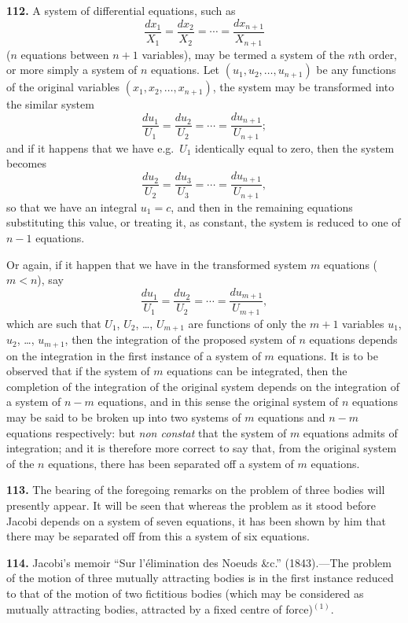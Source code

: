 \documentclass[11pt,a4paper]{article}
\theoremstyle{definition}
\begin{document}
\medskip

\textbf{112.} A system of differential equations, such as
\[
\frac{dx_1}{X_1} = \frac{dx_2}{X_2} = \cdots = \frac{dx_{n+1}}{X_{n+1}}
\]
($n$ equations between $n+1$ variables), may be termed a system of the $n$th order, or more simply a system of $n$ equations. Let $(u_1, u_2, \dots, u_{n+1})$ be any functions of the original variables $(x_1, x_2, \dots, x_{n+1})$, the system may be transformed into the similar system
\[
\frac{du_1}{U_1} = \frac{du_2}{U_2} = \cdots = \frac{du_{n+1}}{U_{n+1}};
\]
and if it happens that we have e.g.\ $U_1$ identically equal to zero, then the system becomes
\[
\frac{du_2}{U_2} = \frac{du_3}{U_3} = \cdots = \frac{du_{n+1}}{U_{n+1}},
\]
so that we have an integral $u_1 = c$, and then in the remaining equations substituting this value, or treating it, as constant, the system is reduced to one of $n-1$ equations.

Or again, if it happen that we have in the transformed system $m$ equations ($m < n$), say
\[
\frac{du_1}{U_1} = \frac{du_2}{U_2} = \cdots = \frac{du_{m+1}}{U_{m+1}},
\]
which are such that $U_1$, $U_2$, \dots, $U_{m+1}$ are functions of only the $m+1$ variables $u_1$, $u_2$, \dots, $u_{m+1}$, then the integration of the proposed system of $n$ equations depends on the integration in the first instance of a system of $m$ equations. It is to be observed that if the system of $m$ equations can be integrated, then the completion of the integration of the original system depends on the integration of a system of $n - m$ equations, and in this sense the original system of $n$ equations may be said to be broken up into two systems of $m$ equations and $n-m$ equations respectively: but \textit{non constat} that the system of $m$ equations admits of integration; and it is therefore more correct to say that, from the original system of the $n$ equations, there has been separated off a system of $m$ equations.

\textbf{113.} The bearing of the foregoing remarks on the problem of three bodies will presently appear. It will be seen that whereas the problem as it stood before Jacobi depends on a system of seven equations, it has been shown by him that there may be separated off from this a system of six equations.

\textbf{114.} Jacobi's memoir ``Sur l'\'elimination des Noeuds \&c.'' (1843).---The problem of the motion of three mutually attracting bodies is in the first instance reduced to that of the motion of two fictitious bodies (which may be considered as mutually attracting bodies, attracted by a fixed centre of force)$^{(1)}$.
\end{document}
